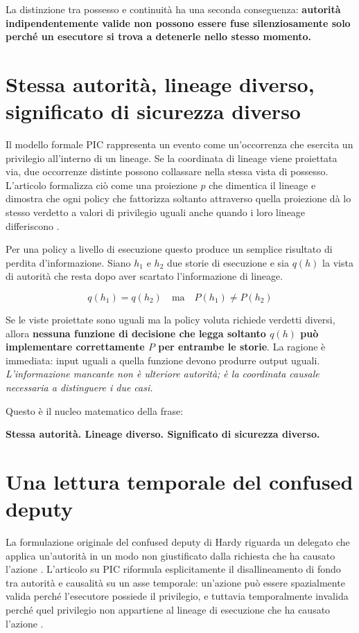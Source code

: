 \documentclass[10pt,oneside,openany]{book}
\begin{document}
La distinzione tra possesso e continuità ha una seconda conseguenza: \textbf{autorità indipendentemente valide non possono essere fuse silenziosamente solo perché un esecutore si trova a detenerle nello stesso momento.}

\section{Stessa autorità, lineage diverso, significato di sicurezza diverso}
Il modello formale PIC rappresenta un evento come un'occorrenza che esercita un privilegio all'interno di un lineage. Se la coordinata di lineage viene proiettata via, due occorrenze distinte possono collassare nella stessa vista di possesso. L'articolo formalizza ciò come una proiezione $p$ che dimentica il lineage e dimostra che ogni policy che fattorizza soltanto attraverso quella proiezione dà lo stesso verdetto a valori di privilegio uguali anche quando i loro lineage differiscono \cite{gallo2026pic}.

Per una policy a livello di esecuzione questo produce un semplice risultato di perdita d'informazione. Siano $h_1$ e $h_2$ due storie di esecuzione e sia $q(h)$ la vista di autorità che resta dopo aver scartato l'informazione di lineage.
\begin{formulabox}
\[
q(h_1)=q(h_2)
\quad\text{ma}\quad
P(h_1)\neq P(h_2)
\]
\end{formulabox}
Se le viste proiettate sono uguali ma la policy voluta richiede verdetti diversi, allora \textbf{nessuna funzione di decisione che legga soltanto $q(h)$ può implementare correttamente $P$ per entrambe le storie}. La ragione è immediata: input uguali a quella funzione devono produrre output uguali. \emph{L'informazione mancante non è ulteriore autorità; è la coordinata causale necessaria a distinguere i due casi.}

Questo è il nucleo matematico della frase:
\begin{center}
\sffamily\bfseries
Stessa autorità. Lineage diverso. Significato di sicurezza diverso.
\end{center}

\section{Una lettura temporale del confused deputy}
La formulazione originale del confused deputy di Hardy riguarda un delegato che applica un'autorità in un modo non giustificato dalla richiesta che ha causato l'azione \cite{hardy1988}. L'articolo su PIC riformula esplicitamente il disallineamento di fondo tra autorità e causalità su un asse temporale: un'azione può essere spazialmente valida perché l'esecutore possiede il privilegio, e tuttavia temporalmente invalida perché quel privilegio non appartiene al lineage di esecuzione che ha causato l'azione \cite{gallo2026pic}.
\end{document}
